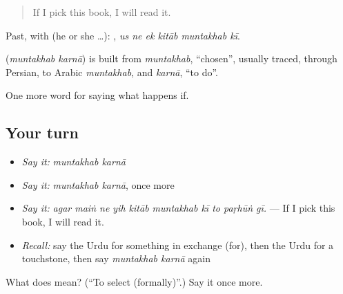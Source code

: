 \begin{quote}
If I pick this book, I will read it.
\end{quote}

Past, with  (he or she …):      , \emph{us ne ek kitāb muntakhab kī}.

\begin{cousinweb}
\textbf{ } (\emph{muntakhab karnā}) is built from \emph{muntakhab}, \textquotedblleft{}chosen\textquotedblright{}, usually traced, through Persian, to Arabic \emph{muntakhab}, and \emph{karnā}, \textquotedblleft{}to do\textquotedblright{}.
\end{cousinweb}

\begin{grammarlens}[title={What you've built}]
One more word for saying what happens if.
\end{grammarlens}

\subsection*{Your turn}
\begin{itemize}
\raggedright
  \item \emph{Say it:} \emph{muntakhab karnā}
  \item \emph{Say it:} \emph{muntakhab karnā}, once more
  \item \emph{Say it:} \emph{agar maiṅ ne yih kitāb muntakhab kī to paṛhūṅ gī.} — If I pick this book, I will read it.
  \item \emph{Recall:} say the Urdu for something in exchange (for), then the Urdu for a touchstone, then say \emph{muntakhab karnā} again
\end{itemize}

\begin{tcolorbox}[breakable,colback=teal!4,colframe=teal!35!black,title={Before you move on}]
What does   mean? (\textquotedblleft{}To select (formally)\textquotedblright{}.) Say it once more.
\end{tcolorbox}
